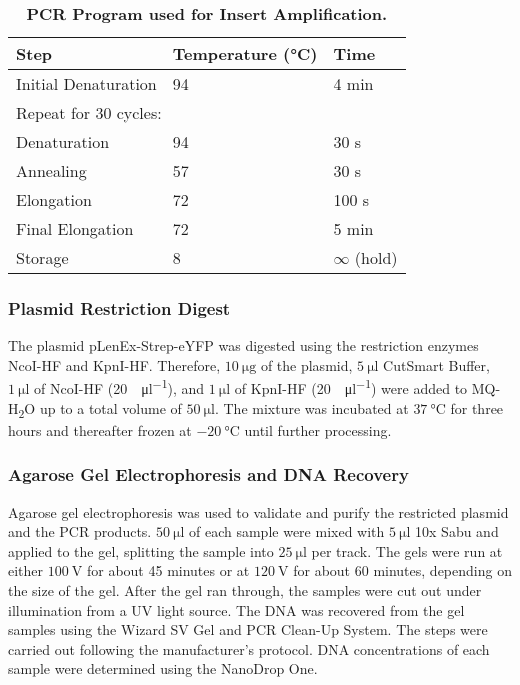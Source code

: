 \begin{table}[ht]
    \centering
    \caption{\textbf{PCR Program used for Insert Amplification.}}
    \label{tab:methods_pcr_cycle}
    \begin{tabular}{lll}
    \toprule
    \textbf{Step} & \textbf{Temperature (°C)} & \textbf{Time} \\
    \midrule
    Initial Denaturation     & 94  & 4 min   \\[1ex]
    \multicolumn{3}{l}{Repeat for 30 cycles:} \\[1ex]
    \quad Denaturation       & 94  & 30 s    \\
    \quad Annealing          & 57  & 30 s    \\
    \quad Elongation         & 72  & 100 s   \\[1ex]
    Final Elongation         & 72  & 5 min   \\
    Storage                  & 8   & $\infty$ (hold)  \\
    \bottomrule
    \end{tabular}
\end{table}
\subsubsection{Plasmid Restriction Digest}
The plasmid pLenEx-Strep-eYFP was digested using the restriction enzymes NcoI-HF and KpnI-HF. Therefore, $\SI{10}{\micro\gram}$ of the plasmid, $\SI{5}{\micro\litre}$ CutSmart\textsuperscript{\textregistered} Buffer, $\SI{1}{\micro\litre}$ of NcoI-HF (\SI{20}{\enzymeUnit\per\micro\litre}), and $\SI{1}{\micro\litre}$ of KpnI-HF (\SI{20}{\enzymeUnit\per\micro\litre}) were added to MQ-H\textsubscript{2}O up to a total volume of $\SI{50}{\micro\litre}$. The mixture was incubated at $\SI{37}{\degreeCelsius}$ for three hours and thereafter frozen at $\SI{-20}{\degreeCelsius}$ until further processing. 

\subsubsection{Agarose Gel Electrophoresis and DNA Recovery}
Agarose gel electrophoresis was used to validate and purify the restricted plasmid and the PCR products. $\SI{50}{\micro\litre}$ of each sample were mixed with $\SI{5}{\micro\litre}$ 10x Sabu and applied to the gel, splitting the sample into $\SI{25}{\micro\litre}$ per track. The gels were run at either $\SI{100}{\volt}$ for about 45 minutes or at $\SI{120}{\volt}$ for about 60 minutes, depending on the size of the gel. After the gel ran through, the samples were cut out under illumination from a UV light source. The DNA was recovered from the gel samples using the Wizard\textsuperscript{\textregistered} SV Gel and PCR Clean-Up System. The steps were carried out following the manufacturer's protocol. DNA concentrations of each sample were determined using the NanoDrop\textsuperscript{\texttrademark} One.

